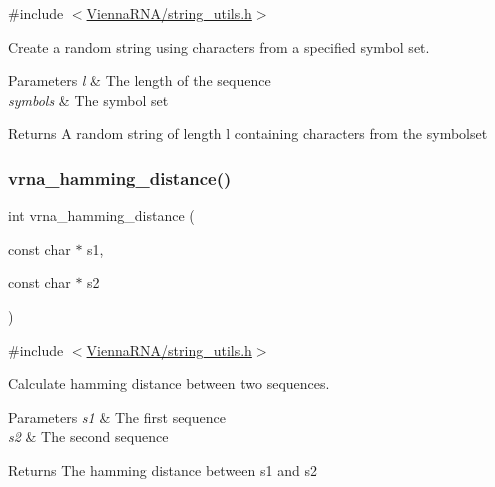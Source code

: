 {\ttfamily \#include $<$\hyperlink{string__utils_8h}{Vienna\+R\+N\+A/string\+\_\+utils.\+h}$>$}



Create a random string using characters from a specified symbol set. 


\begin{DoxyParams}{Parameters}
{\em l} & The length of the sequence \\
\hline
{\em symbols} & The symbol set \\
\hline
\end{DoxyParams}
\begin{DoxyReturn}{Returns}
A random string of length \textquotesingle{}l\textquotesingle{} containing characters from the symbolset 
\end{DoxyReturn}
\mbox{\label{group__string__utils_ga301798b43b6f66687985c725efd14f32}} 
\subsubsection{\texorpdfstring{vrna\+\_\+hamming\+\_\+distance()}{vrna\_hamming\_distance()}}
{\footnotesize\ttfamily int vrna\+\_\+hamming\+\_\+distance (\begin{DoxyParamCaption}\item[{const char $\ast$}]{s1,  }\item[{const char $\ast$}]{s2 }\end{DoxyParamCaption})}



{\ttfamily \#include $<$\hyperlink{string__utils_8h}{Vienna\+R\+N\+A/string\+\_\+utils.\+h}$>$}



Calculate hamming distance between two sequences. 


\begin{DoxyParams}{Parameters}
{\em s1} & The first sequence \\
\hline
{\em s2} & The second sequence \\
\hline
\end{DoxyParams}
\begin{DoxyReturn}{Returns}
The hamming distance between s1 and s2 
\end{DoxyReturn}
\mbox{\label{group__string__utils_ga5d1c2271e79d9bcb52d4e68360763fb9}} 
